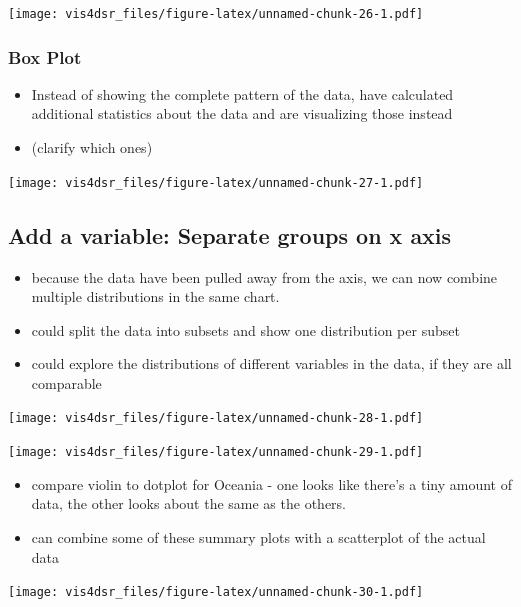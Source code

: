 \documentclass[
]{krantz}
\providecommand{\tightlist}{%
  \setlength{\itemsep}{0pt}\setlength{\parskip}{0pt}}
\begin{document}
\texttt{[image: vis4dsr\_files/figure-latex/unnamed-chunk-26-1.pdf]}

\hypertarget{box-plot}{%
\subsubsection{Box Plot}\label{box-plot}}

\begin{itemize}
\tightlist
\item
  Instead of showing the complete pattern of the data, have calculated additional
  statistics about the data and are visualizing those instead
\item
  (clarify which ones)
\end{itemize}

\texttt{[image: vis4dsr\_files/figure-latex/unnamed-chunk-27-1.pdf]}

\hypertarget{add-a-variable-separate-groups-on-x-axis}{%
\subsection{Add a variable: Separate groups on x axis}\label{add-a-variable-separate-groups-on-x-axis}}

\begin{itemize}
\tightlist
\item
  because the data have been pulled away from the axis, we can now combine multiple
  distributions in the same chart.
\item
  could split the data into subsets and show one distribution per subset
\item
  could explore the distributions of different variables in the data, if they
  are all comparable
\end{itemize}

\texttt{[image: vis4dsr\_files/figure-latex/unnamed-chunk-28-1.pdf]}

\texttt{[image: vis4dsr\_files/figure-latex/unnamed-chunk-29-1.pdf]}

\begin{itemize}
\tightlist
\item
  compare violin to dotplot for Oceania - one looks like there's a tiny amount of data,
  the other looks about the same as the others.
\item
  can combine some of these summary plots with a scatterplot of the actual data
\end{itemize}

\texttt{[image: vis4dsr\_files/figure-latex/unnamed-chunk-30-1.pdf]}
\end{document}
